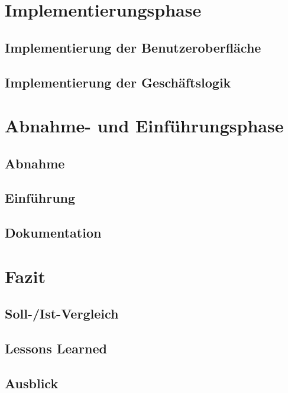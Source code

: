 \chapter{Implementierungsphase}
\section{Implementierung der Benutzeroberfläche}
\section{Implementierung der Geschäftslogik}

\chapter{Abnahme- und Einführungsphase}

\section{Abnahme}
\section{Einführung}
\section{Dokumentation}

\chapter{Fazit}
\section{Soll-/Ist-Vergleich}
\section{Lessons Learned}
\section{Ausblick}
